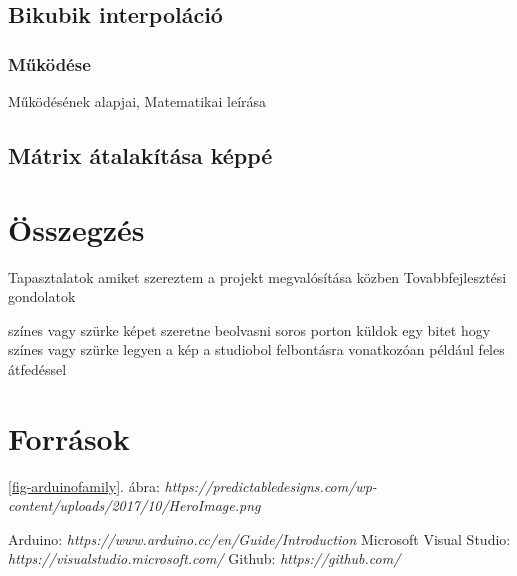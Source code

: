 \documentclass[]{thesis-ekf}
\theoremstyle{definition}
\theoremstyle{remark}
\begin{document}
\section{Bikubik interpoláció}
\subsection{Működése}
Működésének alapjai, Matematikai leírása
\section{Mátrix átalakítása képpé}



\chapter*{Összegzés}
Tapasztalatok amiket szereztem a projekt megvalósítása közben
Tovabbfejlesztési gondolatok

színes vagy szürke képet szeretne beolvasni
soros porton küldok egy bitet hogy színes vagy szürke legyen a kép a studiobol
felbontásra vonatkozóan például  feles átfedéssel 
\chapter*{Források}
\ref{fig-arduinofamily}. ábra: \emph{https://predictabledesigns.com/wp-content/uploads/2017/10/HeroImage.png}
\begin{thebibliography}{2}
 Arduino: \emph{https://www.arduino.cc/en/Guide/Introduction}
 Microsoft Visual Studio: \emph{https://visualstudio.microsoft.com/}
 Github: \emph{https://github.com/}
\end{thebibliography}


\end{document}
